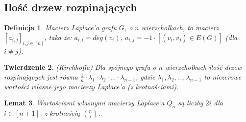 \documentclass{pracamgr}
\newtheorem{theorem}{Twierdzenie}[chapter]
\newtheorem{defi}[theorem]{Definicja}
\newtheorem{lemma}[theorem]{Lemat}
\begin{document}
   \subsection{Ilość drzew rozpinających}
    \begin{defi}
     Macierz Laplace'a grafu $G$, o $n$ wierzchołkach, to macierz $[a_{i,j}]_{i,j\in[n]}$, taka że:\quad
     $a_{i,i}=deg(v_i)$, $a_{i,j}=-1\cdot [(v_i,v_j)\in E(G)]$ (dla $i\neq j$).
    \end{defi}
    \begin{theorem}\label{Kirchhoff}
     (Kirchhoffa)\newline
     Dla spójnego grafu o $n$ wierzchołkach ilość drzew rozpinających jest równa $\frac{1}{n}\cdot\lambda_1\cdot\lambda_2\cdot...\cdot\lambda_{n-1}$,
     gdzie $\lambda_1,\lambda_2,...,\lambda_{n-1}$ to niezerowe wartości własne jego macierzy Laplace'a (z krotnościami).
    \end{theorem}
    \begin{lemma}
     Wartościami własnymi macierzy Laplace'a $Q_n$ są liczby $2i$ dla $i\in[n+1]$, z krotnością ${n\choose i}$.
    \end{lemma}
\end{document}
